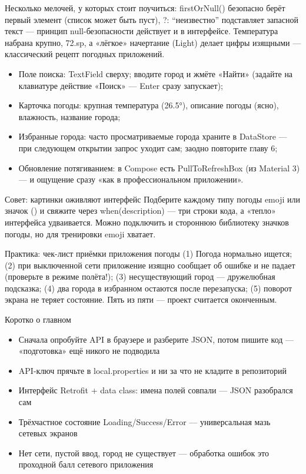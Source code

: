 Несколько мелочей, у которых стоит поучиться: firstOrNull() безопасно берёт первый элемент (список может быть пуст), ?: “неизвестно” подставляет запасной текст — принцип null-безопасности действует и в интерфейсе. Температура набрана крупно, 72.sp, а «лёгкое» начертание (Light) делает цифры изящными — классический рецепт погодных приложений.



\begin{itemize}
  \item Поле поиска: TextField сверху; вводите город и жмёте «Найти» (задайте на клавиатуре действие «Поиск» — Enter сразу запускает);
  \item Карточка погоды: крупная температура (26.5°), описание погоды (ясно), влажность, название города;
  \item Избранные города: часто просматриваемые города храните в DataStore — при следующем открытии запрос уходит сам; заодно повторите главу 6;
  \item Обновление потягиванием: в Compose есть PullToRefreshBox (из Material 3) — и ощущение сразу «как в профессиональном приложении».
\end{itemize}

\begin{tcbinfo}{Совет: картинки оживляют интерфейс}
Подберите каждому типу погоды emoji или значок () и свяжите через when(description) — три строки кода, а «тепло» интерфейса удваивается. Можно подключить и стороннюю библиотеку значков погоды, но для тренировки emoji хватает.

\end{tcbinfo}

\begin{tcbpractice}{Практика: чек-лист приёмки приложения погоды}
(1) Погода нормально ищется; (2) при выключенной сети приложение изящно сообщает об ошибке и не падает (проверьте в режиме полёта!); (3) несуществующий город — дружелюбная подсказка; (4) два города в избранном остаются после перезапуска; (5) поворот экрана не теряет состояние. Пять из пяти — проект считается оконченным.

\end{tcbpractice}

\begin{tcbsummary}{Коротко о главном}
\begin{itemize}
  \item Сначала опробуйте API в браузере и разберите JSON, потом пишите код — «подготовка» ещё никого не подводила
  \item API-ключ прячьте в local.properties и ни за что не кладите в репозиторий
  \item Интерфейс Retrofit + data class: имена полей совпали — JSON разобрался сам
  \item Трёхчастное состояние Loading/Success/Error — универсальная мазь сетевых экранов
  \item Нет сети, пустой ввод, город не существует — обработка ошибок это проходной балл сетевого приложения
\end{itemize}

\end{tcbsummary}

